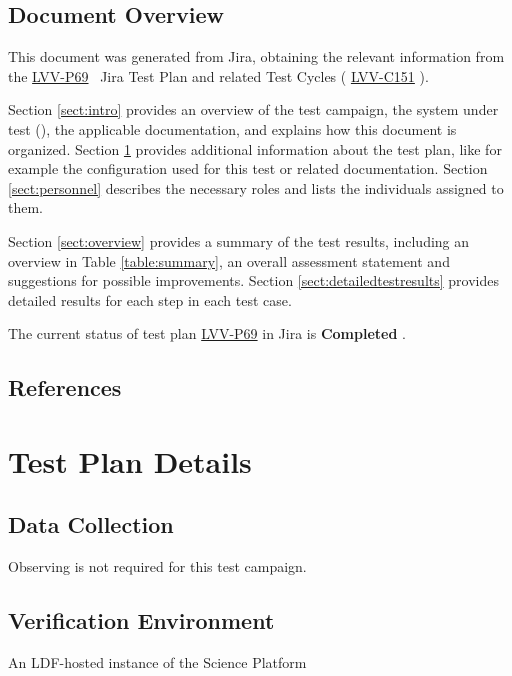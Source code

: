 \documentclass[DM,lsstdraft,STR,toc]{lsstdoc}
\begin{document}
\subsection{Document Overview}
\label{sect:docoverview}

This document was generated from Jira, obtaining the relevant information from the
\href{https://jira.lsstcorp.org/secure/Tests.jspa\#/testPlan/LVV-P69}{LVV-P69}
~Jira Test Plan and related Test Cycles (
\href{https://jira.lsstcorp.org/secure/Tests.jspa\#/testCycle/LVV-C151}{LVV-C151}
).

Section \ref{sect:intro} provides an overview of the test campaign, the system under test (\product{}),
the applicable documentation, and explains how this document is organized.
Section \ref{sect:testplan} provides additional information about the test plan, like for example the configuration
used for this test or related documentation.
Section \ref{sect:personnel} describes the necessary roles and lists the individuals assigned to them.

Section \ref{sect:overview} provides a summary of the test results, including an overview in Table \ref{table:summary},
an overall assessment statement and suggestions for possible improvements.
Section \ref{sect:detailedtestresults} provides detailed results for each step in each test case.

The current status of test plan \href{https://jira.lsstcorp.org/secure/Tests.jspa\#/testPlan/LVV-P69}{LVV-P69} in Jira is \textbf{ Completed }.

\subsection{References}
\label{sect:references}
\renewcommand{\refname}{}



\newpage
\section{Test Plan Details}
\label{sect:testplan}


\subsection{Data Collection}

  Observing is not required for this test campaign.

\subsection{Verification Environment}
\label{sect:hwconf}
  An LDF-hosted instance of the Science Platform
\end{document}
